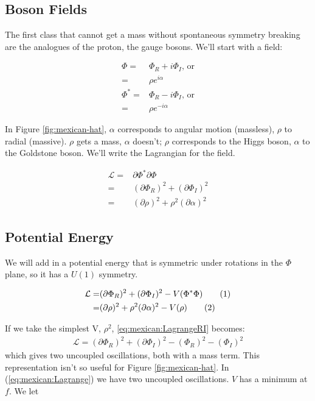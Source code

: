 \documentclass[]{article}
\newcommand\numberthis{\addtocounter{equation}{1}\tag{\theequation}}
\begin{document}
\subsection{Boson Fields}

The first class that cannot get a mass without spontaneous symmetry breaking are the analogues of the proton, the gauge bosons. We'll start with a field:

\begin{align*}
	\Phi =& \Phi_R + i \Phi_I \text{, or}\\
	=& \rho e^{i \alpha}\\
	\Phi^* =& \Phi_R - i \Phi_I \text{, or}\\
	=& \rho e^{-i \alpha}
\end{align*}

In Figure \ref{fig:mexican-hat}, $\alpha$ corresponds to angular motion (massless), $\rho$  to radial (massive). $\rho$ gets a mass,  $\alpha$ doesn't; $\rho$ corresponds to the Higgs boson,  $\alpha$ to the Goldstone boson. We'll write the Lagrangian for the field.

\begin{align*}
	\mathcal{L} =& \partial \Phi^* \partial \Phi \\
	=&(\partial \Phi_R)^2 + (\partial \Phi_I)^2\\
	=& (\partial \rho)^2 + \rho^2 (\partial \alpha)^2 
\end{align*} 

\subsection{Potential Energy}
We will add in a potential energy that is symmetric under rotations in the $\Phi$ plane, so it has a $U(1)$ symmetry.

\begin{align*}
	\mathcal{L}	=&(\partial \Phi_R)^2 + (\partial \Phi_I)^2 - V(\Phi^*\Phi)  \numberthis \label{eq:mexican:LagrangeRI}\\
	=& (\partial \rho)^2 + \rho^2 (\partial \alpha)^2 - V(\rho) \numberthis \label{eq:mexican:Lagrange}
\end{align*} 

If we take the simplest V, $\rho^2$, \eqref{eq:mexican:LagrangeRI} becomes:
\begin{align*}
	\mathcal{L} = (\partial \Phi_R)^2 +  (\partial \Phi_I)^2 -(\Phi_R)^2  -(\Phi_I)^2
\end{align*}
which gives two uncoupled oscillations, both with a mass term. This representation isn't so useful for Figure \ref{fig:mexican-hat}. In (\ref{eq:mexican:Lagrange}) we have two uncoupled oscillations. $V$ has a minimum at $f$. We let
\end{document}
